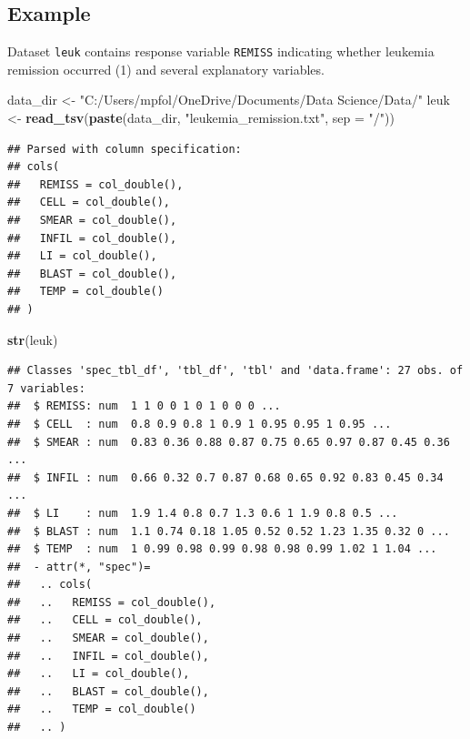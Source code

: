 \documentclass[
]{book}
\newenvironment{Shaded}{\begin{snugshade}}{\end{snugshade}}
\newcommand{\DataTypeTok}[1]{\textcolor[rgb]{0.13,0.29,0.53}{#1}}
\newcommand{\KeywordTok}[1]{\textcolor[rgb]{0.13,0.29,0.53}{\textbf{#1}}}
\newcommand{\NormalTok}[1]{#1}
\newcommand{\StringTok}[1]{\textcolor[rgb]{0.31,0.60,0.02}{#1}}
\begin{document}
\hypertarget{example}{%
\subsection*{Example}\label{example}}

Dataset \texttt{leuk} contains response variable \texttt{REMISS} indicating whether leukemia remission occurred (1) and several explanatory variables.

\begin{Shaded}
\begin{Highlighting}[]
\NormalTok{data_dir <-}\StringTok{ "C:/Users/mpfol/OneDrive/Documents/Data Science/Data/"}
\NormalTok{leuk <-}\StringTok{ }\KeywordTok{read_tsv}\NormalTok{(}\KeywordTok{paste}\NormalTok{(data_dir, }\StringTok{"leukemia_remission.txt"}\NormalTok{, }\DataTypeTok{sep =} \StringTok{"/"}\NormalTok{))}
\end{Highlighting}
\end{Shaded}

\begin{verbatim}
## Parsed with column specification:
## cols(
##   REMISS = col_double(),
##   CELL = col_double(),
##   SMEAR = col_double(),
##   INFIL = col_double(),
##   LI = col_double(),
##   BLAST = col_double(),
##   TEMP = col_double()
## )
\end{verbatim}

\begin{Shaded}
\begin{Highlighting}[]
\KeywordTok{str}\NormalTok{(leuk)}
\end{Highlighting}
\end{Shaded}

\begin{verbatim}
## Classes 'spec_tbl_df', 'tbl_df', 'tbl' and 'data.frame': 27 obs. of  7 variables:
##  $ REMISS: num  1 1 0 0 1 0 1 0 0 0 ...
##  $ CELL  : num  0.8 0.9 0.8 1 0.9 1 0.95 0.95 1 0.95 ...
##  $ SMEAR : num  0.83 0.36 0.88 0.87 0.75 0.65 0.97 0.87 0.45 0.36 ...
##  $ INFIL : num  0.66 0.32 0.7 0.87 0.68 0.65 0.92 0.83 0.45 0.34 ...
##  $ LI    : num  1.9 1.4 0.8 0.7 1.3 0.6 1 1.9 0.8 0.5 ...
##  $ BLAST : num  1.1 0.74 0.18 1.05 0.52 0.52 1.23 1.35 0.32 0 ...
##  $ TEMP  : num  1 0.99 0.98 0.99 0.98 0.98 0.99 1.02 1 1.04 ...
##  - attr(*, "spec")=
##   .. cols(
##   ..   REMISS = col_double(),
##   ..   CELL = col_double(),
##   ..   SMEAR = col_double(),
##   ..   INFIL = col_double(),
##   ..   LI = col_double(),
##   ..   BLAST = col_double(),
##   ..   TEMP = col_double()
##   .. )
\end{verbatim}
\end{document}

